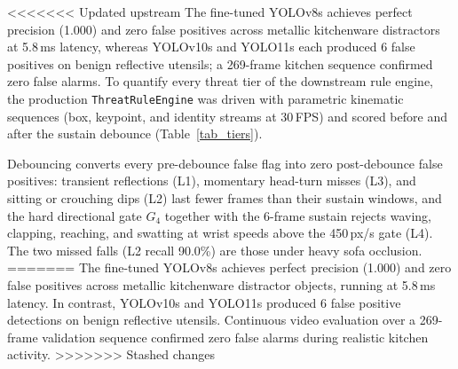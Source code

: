 \documentclass[conference]{IEEEtran}
\begin{document}
<<<<<<< Updated upstream
The fine-tuned YOLOv8s achieves perfect precision (1.000) and zero false positives across metallic kitchenware distractors at 5.8\,ms latency, whereas YOLOv10s and YOLO11s each produced 6 false positives on benign reflective utensils; a 269-frame kitchen sequence confirmed zero false alarms. To quantify every threat tier of the downstream rule engine, the production \texttt{ThreatRuleEngine} was driven with parametric kinematic sequences (box, keypoint, and identity streams at 30\,FPS) and scored before and after the sustain debounce (Table~\ref{tab_tiers}).

\begin{table}[htbp]
\caption{Per-Tier Vision Evaluation of the Rule Engine (Kinematic Replay)}
\centering
\renewcommand{\arraystretch}{0.90}
\label{tab_tiers}
\end{table}

Debouncing converts every pre-debounce false flag into zero post-debounce false positives: transient reflections (L1), momentary head-turn misses (L3), and sitting or crouching dips (L2) last fewer frames than their sustain windows, and the hard directional gate $G_4$ together with the 6-frame sustain rejects waving, clapping, reaching, and swatting at wrist speeds above the 450\,px/s gate (L4). The two missed falls (L2 recall 90.0\%) are those under heavy sofa occlusion.
=======
The fine-tuned YOLOv8s achieves perfect precision (1.000) and zero false positives across metallic kitchenware distractor objects, running at 5.8\,ms latency. In contrast, YOLOv10s and YOLO11s produced 6 false positive detections on benign reflective utensils. Continuous video evaluation over a 269-frame validation sequence confirmed zero false alarms during realistic kitchen activity.
>>>>>>> Stashed changes
\end{document}
